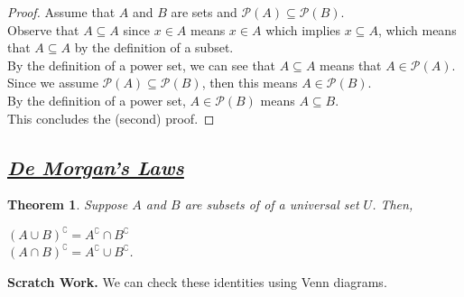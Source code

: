 \documentclass{amsart} %
\newtheorem{thm}{Theorem} %
\theoremstyle{definition} %
\theoremstyle{proposition} %
\theoremstyle{remark} %
\begin{document}
\begin{proof}
      Assume that $A$ and $B$ are sets and $\mathcal{P}(A) \subseteq \mathcal{P}(B)$. \\
      \indent Observe that $A \subseteq A$ since $x \in A$ means $x \in A$ which implies $x \subseteq A$, which means that $A \subseteq A$ by the definition of a subset. \\
      \indent By the definition of a power set, we can see that $A \subseteq A$ means that $A \in \mathcal{P}(A)$. Since we assume $\mathcal{P}(A) \subseteq \mathcal{P}(B)$, then this means $A \in \mathcal{P}(B)$. \\
      \indent By the definition of a power set, $A \in \mathcal{P}(B)$ means $A \subseteq B$. \\
      \indent This concludes the (second) proof.
\end{proof}













\bigskip \bigskip

\subsection{\underline{\emph{De Morgan's Laws}}}

\begin{thm}
      Suppose $A$ and $B$ are subsets of of a universal set $U$. Then,
      \begin{center}
            $(A \cup B)^\complement = A^\complement \cap B^\complement$ \\
            $(A \cap B)^\complement = A^\complement \cup B^\complement$.
      \end{center}
\end{thm}



\noindent \textbf{Scratch Work.} We can check these identities using Venn diagrams.
\end{document}
